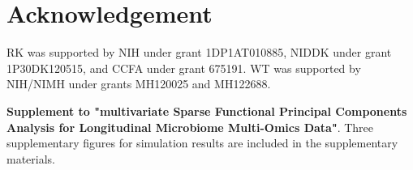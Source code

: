 \documentclass[aoas,preprint]{imsart}
\begin{document}
\section{Acknowledgement}
RK was supported by NIH under grant 1DP1AT010885, NIDDK under grant 1P30DK120515, and CCFA under grant 675191. WT was supported by NIH/NIMH under grants MH120025 and MH122688.

%
%

% 
% 
 
\begin{supplement}
\textbf{Supplement to "multivariate Sparse Functional Principal Components Analysis for Longitudinal Microbiome Multi-Omics Data"}. Three supplementary figures for simulation results are included in the supplementary materials.
\end{supplement}
\end{document}
